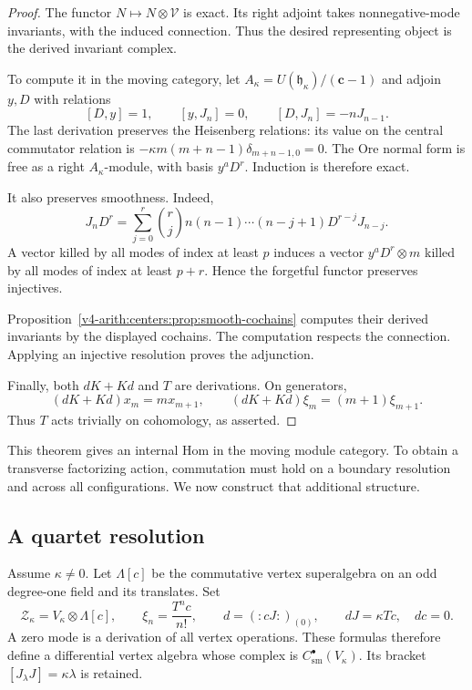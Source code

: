 \begin{proof}
The functor $N\mapsto N\otimes\mathcal V$ is exact.
Its right adjoint takes nonnegative-mode invariants, with the
induced connection. Thus the desired representing object is
the derived invariant complex.

To compute it in the moving category, let
$A_\kappa=U(\mathfrak h_\kappa)/(\mathbf c-1)$ and adjoin
$y,D$ with relations
\[
 [D,y]=1,\qquad [y,J_n]=0,\qquad [D,J_n]=-nJ_{n-1}.
\]
The last derivation preserves the Heisenberg relations:
its value on the central commutator relation is
$-\kappa m(m+n-1)\delta_{m+n-1,0}=0$.
The Ore normal form is free as a right $A_\kappa$-module,
with basis $y^aD^r$. Induction is therefore exact.

It also preserves smoothness. Indeed,
\[
 J_nD^r=\sum_{j=0}^r
 \binom rj n(n-1)\cdots(n-j+1)D^{r-j}J_{n-j}.
\]
A vector killed by all modes of index at least $p$ induces
a vector $y^aD^r\otimes m$ killed by all modes of index
at least $p+r$. Hence the forgetful functor preserves injectives.

Proposition~\ref{v4-arith:centers:prop:smooth-cochains}
computes their derived invariants by the displayed cochains.
The computation respects the connection. Applying an injective
resolution proves the adjunction.

Finally, both $dK+Kd$ and $T$ are derivations. On generators,
\[
 (dK+Kd)x_m=mx_{m+1},\qquad
 (dK+Kd)\xi_m=(m+1)\xi_{m+1}.
\]
Thus $T$ acts trivially on cohomology, as asserted.
\end{proof}

This theorem gives an internal Hom in the moving module category.
To obtain a transverse factorizing action, commutation must hold
on a boundary resolution and across all configurations. We now
construct that additional structure.

\subsection{A quartet resolution}

Assume $\kappa\ne0$. Let $\Lambda[c]$ be the commutative
vertex superalgebra on an odd degree-one field and its translates.
Set
\[
 \mathcal Z_\kappa=V_\kappa\otimes\Lambda[c],
 \qquad \xi_n=\frac{T^nc}{n!},\qquad
 d=(:cJ:)_{(0)},\qquad dJ=\kappa Tc,\quad dc=0.
\]
A zero mode is a derivation of all vertex operations.
These formulas therefore define a differential vertex algebra
whose complex is $C^\bullet_{\mathrm{sm}}(V_\kappa)$.
Its bracket $[J_\lambda J]=\kappa\lambda$ is retained.

